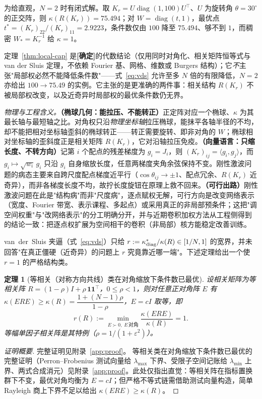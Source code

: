 \documentclass[fontset=windows,11pt]{ctexart}
\newcommand{\W}{W}
\DeclareMathOperator{\diag}{diag}
\newtheorem{theorem}{定理}[section]
\numberwithin{equation}{section}
\begin{document}
\noindent 为给直观，$N=2$ 时有闭式解。取 $K_r=U\diag(1,100)U^\top$、$U$ 为旋转角 $\theta=30^\circ$ 的正交阵，则 $\kappa(R(K_r))=75.494$；对 $\W=\diag(t,1)$，最优点 $t^*=(K_r)_{22}/(K_r)_{11}=2.9223$，条件数仅由 $100$ 降至 $75.494$、够不到 $1$，而稠密 $\W_*=K_r^{-1}$ 给 $\kappa=1$。

\noindent 定理~\ref{thm:local-cap} 是\textbf{[确定]}的代数结论（仅用同时对角化、相关矩阵恒等式与 van der Sluis 定理，不依赖 Fourier 基、网格、维数或 Burgers 结构）；它\emph{不}主张"局部权必然不能降低条件数"——式~\eqref{eq:vds} 允许至多 $N$ 倍的有限降低，$N=2$ 亦给出 $100\to75.49$ 的实例。它主张的是更准确的两件事：相关结构 $R(K_r)$ 不被局部权改变，以及近奇异时局部权的最优条件数仍无界。

\noindent\emph{物理与工程含义。}\textbf{（椭球几何：能拉压、不能转正）}正定阵对应一个椭球、$\kappa$ 为其最长轴与最短轴之比。对角权只沿\emph{物理坐标轴}拉压椭球，能抹平各轴半径的不均，却不能把相对坐标轴歪斜的椭球转正——转正需要旋转、即非对角的 $\W$；椭球相对坐标轴的歪斜度正是相关矩阵 $R(K_r)$，它对沿轴拉压免疫。\textbf{（向量语言：只缩长度、不转方向）}记第 $i$ 个配点的残差梯度为 $g_i=J_i$，则 $(K_r)_{ij}=\langle g_i,g_j\rangle$，而 $g_i\mapsto\sqrt{w_i}\,g_i$ 只沿 $g_i$ 自身缩放长度，任意两梯度夹角余弦保持不变。刚性激波问题的病态主要来自跨尺度配点梯度近平行（$\cos\theta_{ij}\to\pm1$、配点冗余、$R(K_r)$ 近奇异），而非各梯度长度不均，故拧长度旋钮在原理上救不回来。\textbf{（可行出路）}刚性激波问题在此是"结构病"而非"尺度病"，逐点赋权无解，可行方向是改变网络表示（宽度、Fourier 带宽、表示课程、多起点）或采用真正的非局部预条件；这把"调空间权重"与"改网络表示"的分工明确分开，并与近期卷积加权方法从工程侧得到的结论一致\cite{SiYan2025}：把逐点权扩展为空间相干的卷积（非局部）核方能稳定改善训练。

van~der~Sluis 夹逼（式~\eqref{eq:vds}）只给 $r:=\kappa^*_{\rm diag}/\kappa(R)\in[1/N,1]$ 的宽界，并未回答"在真正僵硬（近奇异）的问题上 $r$ 究竟靠近哪一端"。下述定理给出一个使 $r=1$ 的严格结构类。

\begin{theorem}[等相关（对称方向共线）类在对角缩放下条件数已最优]\label{thm:equicorr}
设相关矩阵为等相关阵 $R=(1-\rho)I+\rho\,\mathbf 1\mathbf 1^\top$，$0\le\rho<1$，则对任意正对角阵 $E$ 有 $\kappa(ERE)\ge\kappa(R)=\dfrac{1+(N-1)\rho}{1-\rho}$，$E=cI$ 取等，即
\[
r(R):=\min_{E\succ0,\;E\,\text{对角}}\frac{\kappa(ERE)}{\kappa(R)}=1.
\]
等幅单因子相关阵是其特例（$\rho=1/(1+\varepsilon^2)$）。
\end{theorem}
\begin{proof}[证明概要]完整证明见附录~\ref{app:proof}。
等相关类在对角缩放下条件数已最优的完整证明（Perron–Frobenius 测试向量给 $\lambda_{\max}$ 下界、受限子空间记账给 $\lambda_{\min}$ 上界、两式合成消元）见附录~\ref{app:proof}。此处仅指出直觉：等相关阵在指标置换群下不变，最优对角均衡为 $E=cI$；但严格不等式链需借助测试向量构造，简单 Rayleigh 商上下界不足以给出 $\kappa(ERE)\ge\kappa(R)$。
\end{proof}
\end{document}
